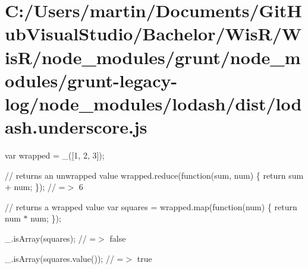 \hypertarget{_c_1_2_users_2martin_2_documents_2_git_hub_visual_studio_2_bachelor_2_wis_r_2_wis_r_2node_modulec1891d9dcaf54a441dc76e632660906b}{}\section{C\+:/\+Users/martin/\+Documents/\+Git\+Hub\+Visual\+Studio/\+Bachelor/\+Wis\+R/\+Wis\+R/node\+\_\+modules/grunt/node\+\_\+modules/grunt-\/legacy-\/log/node\+\_\+modules/lodash/dist/lodash.\+underscore.\+js}
var wrapped = \+\_\+(\mbox{[}1, 2, 3\mbox{]});

// returns an unwrapped value wrapped.\+reduce(function(sum, num) \{ return sum + num; \}); // =$>$ 6

// returns a wrapped value var squares = wrapped.\+map(function(num) \{ return num $\ast$ num; \});

\+\_\+.\+is\+Array(squares); // =$>$ false

\+\_\+.\+is\+Array(squares.\+value()); // =$>$ true


